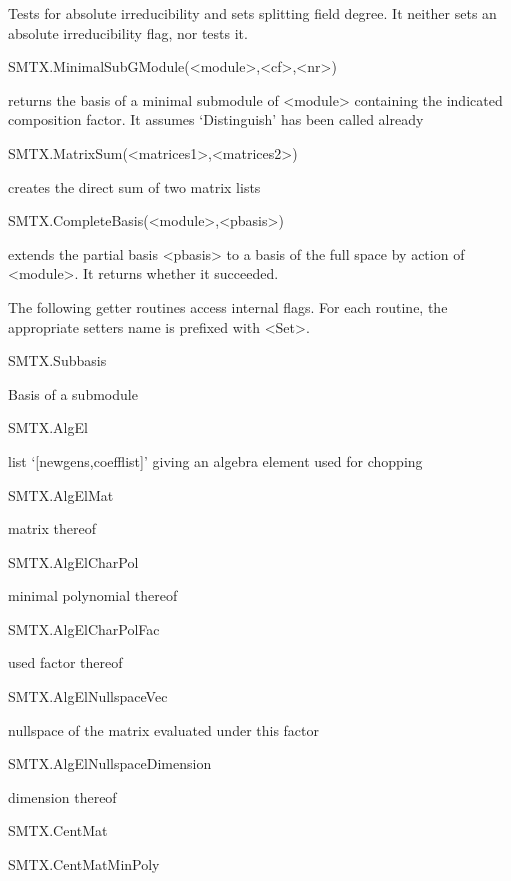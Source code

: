 Tests for absolute irreducibility and sets splitting field degree. It
neither sets an absolute irreducibility flag, nor tests it.

\>SMTX.MinimalSubGModule(<module>,<cf>,<nr>)

returns the basis of a minimal submodule of <module> containing the
indicated composition factor. It assumes `Distinguish' has been called
already

\>SMTX.MatrixSum(<matrices1>,<matrices2>)

creates the direct sum of two matrix lists

\>SMTX.CompleteBasis(<module>,<pbasis>)

extends the partial basis <pbasis> to a basis of the full space
by action of <module>. It returns whether it succeeded.


The following getter routines access internal flags. For each routine, the
appropriate setters name is prefixed with <Set>.

\>SMTX.Subbasis

Basis of a submodule

\>SMTX.AlgEl

list `[newgens,coefflist]' giving an algebra element used for chopping

\>SMTX.AlgElMat

matrix thereof

\>SMTX.AlgElCharPol

minimal polynomial thereof

\>SMTX.AlgElCharPolFac

used factor thereof

\>SMTX.AlgElNullspaceVec

nullspace of the matrix evaluated under this factor

\>SMTX.AlgElNullspaceDimension

dimension thereof

\>SMTX.CentMat


\>SMTX.CentMatMinPoly


